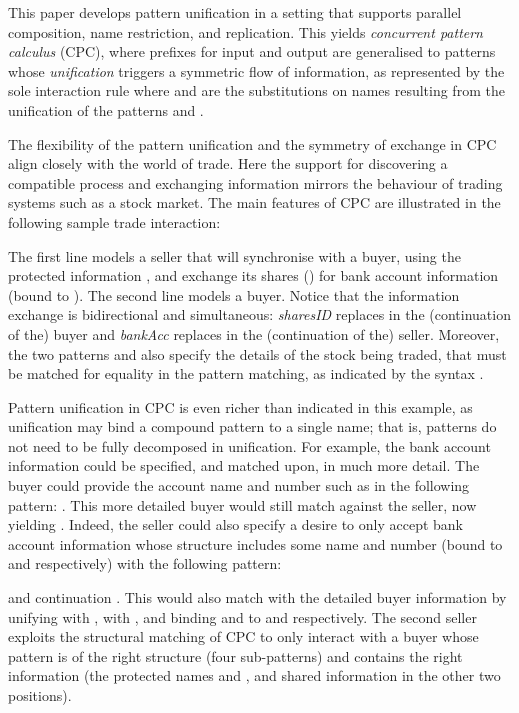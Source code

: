 \documentclass{LMCS}
\begin{document}
This paper develops pattern unification in a setting that supports
parallel composition, name restriction, and replication. This yields
{\em concurrent pattern calculus} (CPC), where prefixes for input and
output are generalised to patterns whose {\em unification} triggers a
symmetric flow of information, as represented by the sole interaction
rule
where  and  are the substitutions on names resulting
from the unification of the patterns  and . 




The flexibility of the pattern unification and the symmetry of exchange 
in CPC align closely with the world of trade. Here the support for 
discovering a compatible process and exchanging information mirrors 
the behaviour of trading systems such as a stock market.
The main features of CPC are illustrated in the following sample trade interaction:

The first line models a seller that will synchronise with a buyer, using the protected
information , and exchange its shares () for bank
account information (bound to ).
The second line models a buyer. Notice that the information exchange is bidirectional
and simultaneous: {\it sharesID} replaces  in the (continuation of the) buyer and
{\it bankAcc} replaces  in the (continuation of the) seller.
Moreover, the two patterns 
and  also specify the
details of the stock being traded, that must be matched for equality in the pattern
matching, as indicated by the syntax .

Pattern unification in CPC is even richer than indicated in this example, as unification
may bind a compound pattern to a single name; that is, patterns do not need to be
fully decomposed in unification.
For example, the bank account information could be specified, and matched upon, in
much more detail.
The buyer could provide the account name and number such as in the following pattern:
.
This more detailed buyer would still match against the seller, now yielding
.
Indeed, the seller could also specify a desire to only accept bank account information
whose structure includes some name and number (bound to  and  respectively) with the following pattern:

and continuation .
This would also match with the detailed buyer information by
unifying  with ,  with , and binding
 and  to  and  respectively.
The second seller exploits the structural matching of CPC to only interact with a
buyer whose pattern is of the right structure (four sub-patterns) and contains
the right information (the protected names  and , and shared information
in the other two positions).
\end{document}
